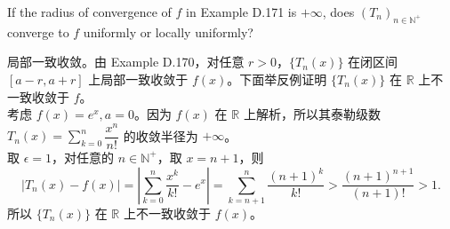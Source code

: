 \documentclass[lang=cn,a4paper,newtx,bibend=bibtex]{elegantpaper}
\begin{document}
\begin{prob}[D.172]
  If the radius of convergence of $f$ in
  Example D.171
  is $+\infty$,
  does $(T_n)_{n\in\mathbb{N}^+}$ converge to $f$
  uniformly or locally uniformly?
\end{prob}

\begin{solution}
    局部一致收敛。由 Example D.170，对任意 $r>0$，$\{T_n(x)\}$ 在闭区间 $[a-r,a+r]$ 上局部一致收敛于 $f(x)$。下面举反例证明 $\{T_n(x)\}$ 在 $\mathbb{R}$ 上不一致收敛于 $f$。\\
    考虑 $f(x) = e^x, a = 0$。因为 $f(x)$ 在 $\mathbb{R}$ 上解析，所以其泰勒级数 $T_n(x) = \sum_{k=0}^n \dfrac{x^n}{n!}$ 的收敛半径为 $+\infty$。\\
    取 $\epsilon=1$，对任意的 $n\in \mathbb{N}^+$，取 $x=n+1$，则
    \begin{equation*}
        |T_n(x)-f(x)| = |\sum_{k=0}^n \dfrac{x^k}{k!} - e^x| = \sum_{k=n+1}^n \dfrac{(n+1)^k}{k!} > \dfrac{(n+1)^{n+1}}{(n+1)!} > 1.
    \end{equation*}
    所以 $\{T_n(x)\}$ 在 $\mathbb{R}$ 上不一致收敛于 $f(x)$。
\end{solution}
\end{document}

